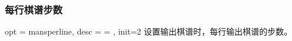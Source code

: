 \documentclass[full]{l3doc}
\def\vers{\texttt{v1.1.0} }
\begin{document}
\begin{documentation}
\subsubsection{每行棋谱步数}

\begin{option}{ opt = mansperline, desc = {= }, init=2 }
  设置输出棋谱时，每行输出棋谱的步数。
\end{option}

\begin{SideBySideExample}[frame=single,numbers=left,
                xrightmargin=.45\linewidth,gobble=2]
  \centering

    \bigskip

    \begin{setcchessman*}[label=test]
       
       
       
       
    \end{setcchessman*}
\end{SideBySideExample}


%
%
%

\end{documentation}
\end{document}
